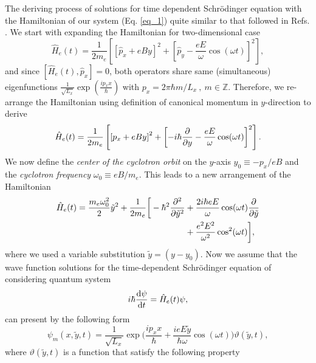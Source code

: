 The deriving process of solutions for time dependent Schrödinger equation with the Hamiltonian of our system (Eq. \ref{eq_1}) quite similar to that followed in Refs. \cite{husimi53,dini16}. We start with expanding the Hamiltonian for two-dimensional case
\begin{equation} \label{eq_a1}
  \hat{H}_e(t) = \frac{1}{2m_e}\left[
    \left[\hat{p}_x + eBy \right]^2 +
    \left[\hat{p}_y - \frac{eE}{\omega}\cos(\omega t)\right]^2
  \right],
\end{equation}
and since $\left[\hat{H}_e(t),\hat{p}_x \right] =0$, both operators share same (simultaneous) eigenfunctions
$\frac{1}{\sqrt{L_x}}\exp(\frac{ip_x x}{\hbar})$ with $p_x = 2\pi \hbar m/L_x~,~ m \in \mathbb{Z}$.
Therefore, we re-arrange the Hamiltonian using definition of canonical momentum in $y$-direction to derive
\begin{equation} \label{eq_a2}
    \hat{H}_e(t) = \frac{1}{2m_e}\left[
      \left[{p}_x + eBy \right]^2 +
      \left[-i\hbar \pdv{y}- \frac{eE}{\omega}\cos(\omega t)\right]^2
    \right].
\end{equation}
We now define the \textit{center of the cyclotron orbit} on the $y$-axis $y_0 \equiv {-p_x}/{eB}$ and the \textit{cyclotron frequency} $\omega_0 \equiv {eB}/{m_e}$. This leads to a new arrangement of the Hamiltonian
\begin{equation} \label{eq_a3}
  \begin{aligned}
    \hat{H}_e(t) =
      \frac{m_e \omega_0^2}{2}\tilde{y}^2 +
      \frac{1}{2m_e}\bigg[
      -\hbar^2 \pdv[2]{\tilde{y}} & +
      \frac{2i\hbar eE}{\omega}\cos(\omega t) \pdv{\tilde{y}} \\
      & +
      \frac{e^2E^2}{\omega^2}\cos[2](\omega t)
      \bigg],
  \end{aligned}
\end{equation}
where we used a variable substitution $\tilde{y} = (y - y_0)$. Now we assume that the wave function solutions for the time-dependent Schrödinger equation of considering quantum system
\begin{equation} \label{eq_a4}
    i \hbar \dv{\psi}{t} = \hat{H}_e(t)\psi,
\end{equation}
can present by the following form
\begin{equation} \label{eq_a5}
    \psi_m(x,\tilde{y},t) = \frac{1}{\sqrt{L_x}} \exp\bigg(
      \frac{ip_x x}{\hbar} +
      \frac{ieE\tilde{y}}{\hbar \omega}\cos(\omega t)
    \bigg) \vartheta(\tilde{y},t),
\end{equation}
where $\vartheta(\tilde{y},t)$ is a function that satisfy the following property
